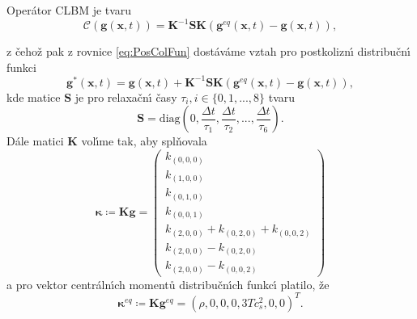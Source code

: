         Oper\'{a}tor CLBM je tvaru 
        \begin{equation}
        \label{eq:ClbOpe}
                    \mathcal{C}(\boldsymbol{g}(\boldsymbol{x},t)) = \boldsymbol{K}^{-1}\boldsymbol{S}\boldsymbol{K}(\boldsymbol{g}^{eq}(\boldsymbol{x},t) - \boldsymbol{g}(\boldsymbol{x},t)),
        \end{equation}

        z \v{c}eho\v{z} pak z rovnice \eqref{eq:PosColFun} dost\'{a}v\'{a}me vztah pro postkolizn\'{\i} distribu\v{c}n\'{\i} funkci
        \begin{equation}
        \label{eq:PosColClb}
                \boldsymbol{g}^{*}(\boldsymbol{x},t) = \boldsymbol{g}(\boldsymbol{x},t) + \boldsymbol{K}^{-1}\boldsymbol{S}\boldsymbol{K}(\boldsymbol{g}^{eq}(\boldsymbol{x},t) - \boldsymbol{g}(\boldsymbol{x},t)),
        \end{equation}
        kde matice $\boldsymbol{S}$ je pro relaxa\v{c}n\'{\i} \v{c}asy $\tau_i, i \in \{ 0,1,...,8 \}$ tvaru
        \begin{equation}
            \label{eq:MatS}
                \boldsymbol{S} = \mathrm{diag}\left(0,\frac{\Delta t}{\tau_1},\frac{\Delta t}{\tau_2},...,\frac{\Delta t}{\tau_6}\right).
        \end{equation}
        D\'{a}le matici $\boldsymbol{K}$ vol\'{\i}me tak, aby spl\v{n}ovala
        \begin{equation}
            \boldsymbol{\kappa}
            \coloneqq \boldsymbol{K}\boldsymbol{g} = \begin{pmatrix} k_{(0,0,0)} \\ k_{(1,0,0)} \\ k_{(0,1,0)} \\ k_{(0,0,1)} \\ k_{(2,0,0)}+k_{(0,2,0)}+k_{(0,0,2)} \\ k_{(2,0,0)}-k_{(0,2,0)} \\ k_{(2,0,0)}-k_{(0,0,2)}\end{pmatrix}
        \end{equation}
        a pro vektor centr\'{a}ln\'{\i}ch moment\r{u} distribu\v{c}n\'{\i}ch funkc\'{\i} platilo, \v{z}e
        \begin{equation}
            \label{eq:KapEqu}
            \boldsymbol{\kappa}^{eq} \coloneqq \boldsymbol{K} \boldsymbol{g}^{eq} = \left( \rho, 0, 0, 0, 3T c_{s}^{2}, 0, 0\right)^T.
        \end{equation}

